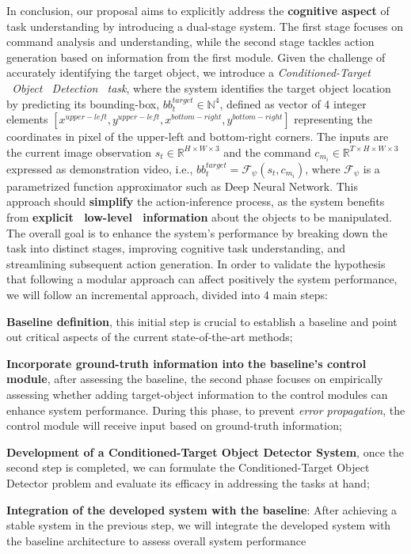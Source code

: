 In conclusion, our proposal aims to explicitly address the \textbf{cognitive aspect} of task understanding by introducing a dual-stage system. The first stage focuses on command analysis and understanding, while the second stage tackles action generation based on information from the first module. Given the challenge of accurately identifying the target object, we introduce a \textit{Conditioned-Target \ Object \ Detection \ task}, where the system identifies the target object location by predicting its bounding-box, $bb_{t}^{target} \in \mathbb{N}^{4}$, defined as vector of 4 integer elements $[x^{upper-left},y^{upper-left}, x^{bottom-right}, y^{bottom-right}]$ representing the coordinates in pixel of the upper-left and bottom-right corners. The inputs are the current image observation $s_{t} \in \mathbb{R}^{H \times W \times 3}$ and the command $c_{m_{i}} \in \mathbb{R}^{T \times H \times W \times 3}$ expressed as demonstration video, i.e., $bb_{t}^{target} = \mathcal{F}_{\psi}(s_{t}, c_{m_{i}})$, where $\mathcal{F}_{\psi}$ is a parametrized function approximator such as Deep Neural Network. This approach should \textbf{simplify} the action-inference process, as the system benefits from \textbf{explicit \ low-level  \ information} about the objects to be manipulated. The overall goal is to enhance the system's performance by breaking down the task into distinct stages, improving cognitive task understanding, and streamlining subsequent action generation.
In order to validate the hypothesis that following a modular approach can affect positively the system performance, we will follow an incremental approach, divided into 4 main steps:
\begin{enumerate*}[label=(\arabic*)]
    \item \textbf{Baseline definition}, this initial step is crucial to establish a baseline and point out critical aspects of the current state-of-the-art methods;
    \item \textbf{Incorporate ground-truth information into the baseline's control module}, after assessing the baseline, the second phase focuses on empirically assessing whether adding target-object information to the control modules can enhance system performance. During this phase, to prevent \textit{error propagation}, the control module will receive input based on ground-truth information;
    \item \textbf{Development of a Conditioned-Target Object Detector System}, once the second step is completed, we can formulate the Conditioned-Target Object Detector problem and evaluate its efficacy in addressing the tasks at hand;
    \item \textbf{Integration of the developed system with the baseline}: After achieving a stable system in the previous step, we will integrate the developed system with the baseline architecture to assess overall system performance
\end{enumerate*}

